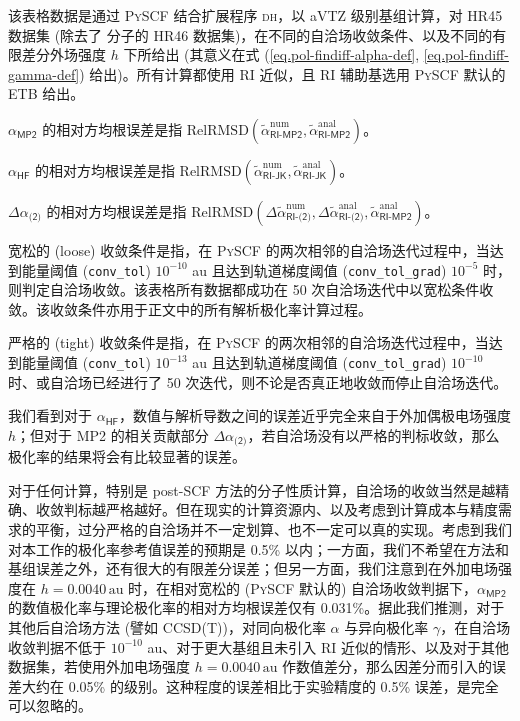\begin{table}[ht]
    \raggedright
    \par{} 该表格数据是通过 \textsc{PySCF} 结合扩展程序 \textsc{dh}，以 aVTZ 级别基组计算，对 HR45 数据集 (除去了  分子的 HR46 数据集)，在不同的自洽场收敛条件、以及不同的有限差分外场强度 $h$ 下所给出 (其意义在式 (\ref{eq.pol-findiff-alpha-def}, \ref{eq.pol-findiff-gamma-def}) 给出)。所有计算都使用 RI 近似，且 RI 辅助基选用 \textsc{PySCF} 默认的 ETB 给出。
    \par{} $\alpha_\textsf{MP2}$ 的相对方均根误差是指 $\text{RelRMSD} (\tilde \alpha^\text{num}_\textsf{RI-MP2}, \tilde \alpha^\text{anal}_\textsf{RI-MP2})$。
    \par{} $\alpha_\textsf{HF}$ 的相对方均根误差是指 $\text{RelRMSD} (\tilde \alpha^\text{num}_\textsf{RI-JK}, \tilde \alpha^\text{anal}_\textsf{RI-JK})$。
    \par{} $\Delta \alpha_\textsf{(2)}$ 的相对方均根误差是指 $\text{RelRMSD} (\Delta \tilde \alpha^\text{num}_\textsf{RI-(2)}, \Delta \tilde \alpha^\text{anal}_\textsf{RI-(2)}, \tilde \alpha^\text{anal}_\textsf{RI-MP2})$。
    \par{} 宽松的 (loose) 收敛条件是指，在 \textsc{PySCF} 的两次相邻的自洽场迭代过程中，当达到能量阈值 (\texttt{conv\_tol}) $10^{-10}$ au 且达到轨道梯度阈值 (\texttt{conv\_tol\_grad}) $10^{-5}$ 时，则判定自洽场收敛。该表格所有数据都成功在 50 次自洽场迭代中以宽松条件收敛。该收敛条件亦用于正文中的所有解析极化率计算过程。
    \par{} 严格的 (tight) 收敛条件是指，在 \textsc{PySCF} 的两次相邻的自洽场迭代过程中，当达到能量阈值 (\texttt{conv\_tol}) $10^{-13}$ au 且达到轨道梯度阈值 (\texttt{conv\_tol\_grad}) $10^{-10}$ 时、或自洽场已经进行了 50 次迭代，则不论是否真正地收敛而停止自洽场迭代。
\end{table}

我们看到对于 $\alpha_\textsf{HF}$，数值与解析导数之间的误差近乎完全来自于外加偶极电场强度 $h$；但对于 MP2 的相关贡献部分 $\Delta \alpha_\textsf{(2)}$，若自洽场没有以严格的判标收敛，那么极化率的结果将会有比较显著的误差。

对于任何计算，特别是 post-SCF 方法的分子性质计算，自洽场的收敛当然是越精确、收敛判标越严格越好。但在现实的计算资源内、以及考虑到计算成本与精度需求的平衡，过分严格的自洽场并不一定划算、也不一定可以真的实现。考虑到我们对本工作的极化率参考值误差的预期是 0.5\% 以内；一方面，我们不希望在方法和基组误差之外，还有很大的有限差分误差；但另一方面，我们注意到在外加电场强度在 $h = 0.0040 \, \text{au}$ 时，在相对宽松的 (\textsc{PySCF} 默认的) 自洽场收敛判据下，$\alpha_\textsf{MP2}$ 的数值极化率与理论极化率的相对方均根误差仅有 0.031\%。据此我们推测，对于其他后自洽场方法 (譬如 CCSD(T))，对同向极化率 $\alpha$ 与异向极化率 $\gamma$，在自洽场收敛判据不低于 $10^{-10}$ au、对于更大基组且未引入 RI 近似的情形、以及对于其他数据集，若使用外加电场强度 $h = 0.0040 \, \text{au}$ 作数值差分，那么因差分而引入的误差大约在 0.05\% 的级别。这种程度的误差相比于实验精度的 0.5\% 误差，是完全可以忽略的。

